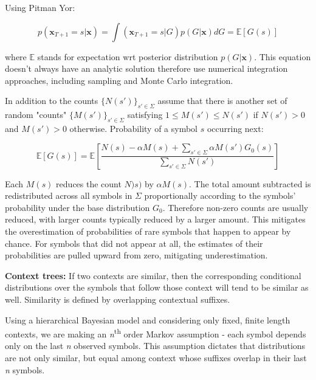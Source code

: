 Using Pitman Yor:

\begin{equation}
p(\boldsymbol{x}_{T+1}=s|\boldsymbol{x})=\int(\boldsymbol{x}_{T+1}=s | G)p(G|\boldsymbol{x})dG={\mathbb E} [G(s)]
\label{eq:seqMemPowerLaw}
\end{equation}

\noindent where $\mathbb E$ stands for expectation wrt posterior distribution $p(G|\boldsymbol{x})$. This equation doesn't always have an analytic solution therefore use numerical integration approaches, including sampling and Monte Carlo integration. 

In addition to the counts $\{N(s')\}_{s' \in \Sigma}$ assume that there is another set of random "counts" $\{M(s')\}_{s' \in \Sigma}$ satisfying $1\leq M(s') \leq N(s')$ if $N(s') >0$ and $M(s')>0$ otherwise. Probability of a symbol $s$ occurring next:

\begin{equation}
\mathbb E [G(s)]=\mathbb E \left [\frac {N(s)-\alpha M(s)+\sum_{s' \in \Sigma}\alpha M(s')G_{0}(s)}{\sum_{s' \in \Sigma}N(s')}\right ]
\label{eq:seqMemPYP}
\end{equation}

\noindent Each $M(s)$ reduces the count $N)s)$ by $\alpha M(s)$. The total amount subtracted is redistributed across all symbols in $\Sigma$ proportionally according to the symbols' probability under the base distribution $G_{0}$. Therefore non-zero counts are usually reduced, with larger counts typically reduced by a larger amount. This mitigates the overestimation of probabilities of rare symbols that happen to appear by chance. For symbols that did not appear at all, the estimates of their probabilities are pulled upward from zero, mitigating underestimation.

\textbf{Context trees:} If two contexts are similar, then the corresponding conditional distributions over the symbols that follow those context will tend to be similar as well. Similarity is defined by overlapping contextual suffixes.

Using a hierarchical Bayesian model and considering only fixed, finite length contexts, we are making an \textit{n}\textsuperscript{th} order Markov assumption - each symbol depends only on the last \textit{n} observed symbols. This assumption dictates that distributions are not only similar, but equal among context whose suffixes overlap in their last \textit{n} symbols.


